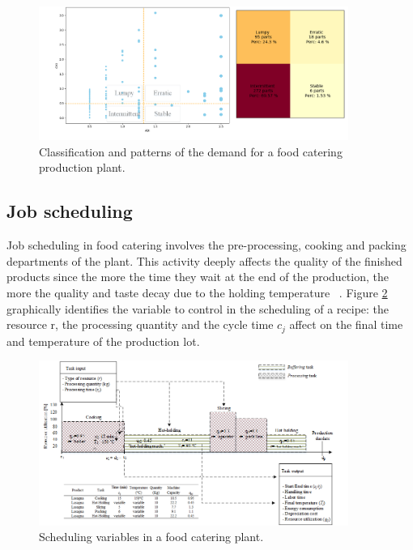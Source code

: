 \begin{figure}[hbt!]
\centering
\includegraphics[width=0.9\textwidth]{sectionProduction/control_figures/fig_prod_CAMST_demandPatterns.png}
\captionsetup{type=figure}
\caption{Classification and patterns of the demand for a food catering production plant.}
\label{fig_prod_CAMST_demandPatterns}
\end{figure}

\subsection{Job scheduling}
Job scheduling in food catering involves the pre-processing, cooking and packing departments of the plant. This activity deeply affects the quality of the finished products since the more the time they wait at the end of the production, the more the quality and taste decay due to the holding temperature ~\cite{Tufano2020}. Figure \ref{fig_prod_CAMST_scheduling} graphically identifies the variable to control in the scheduling of a recipe: the resource r, the processing quantity and the cycle time $c_j$ affect on the final time and temperature of the production lot.

\begin{figure}[hbt!]
\centering
\includegraphics[width=0.9\textwidth]{sectionProduction/control_figures/fig_prod_CAMST_scheduling.png}
\captionsetup{type=figure}
\caption{Scheduling variables in a food catering plant.}
\label{fig_prod_CAMST_scheduling}
\end{figure}

